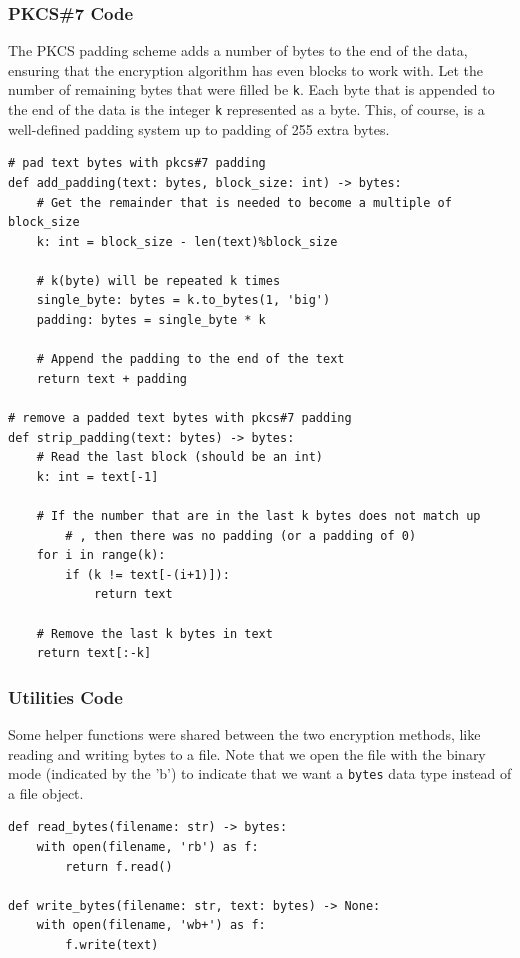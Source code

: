 \documentclass[11pt]{article}
\begin{document}
\subsubsection*{PKCS\#7 Code} 

The PKCS padding scheme adds a number of bytes to the end of the data, ensuring that the encryption algorithm has even blocks to work with. Let the number of remaining bytes that were filled be \verb|k|. Each byte that is appended to the end of the data is the integer \verb|k| represented as a byte. This, of course, is a well-defined padding system up to padding of 255 extra bytes.

\begin{framed}
\begin{verbatim}
# pad text bytes with pkcs#7 padding
def add_padding(text: bytes, block_size: int) -> bytes:
    # Get the remainder that is needed to become a multiple of block_size
    k: int = block_size - len(text)%block_size

    # k(byte) will be repeated k times
    single_byte: bytes = k.to_bytes(1, 'big')
    padding: bytes = single_byte * k

    # Append the padding to the end of the text 
    return text + padding 

# remove a padded text bytes with pkcs#7 padding
def strip_padding(text: bytes) -> bytes:
    # Read the last block (should be an int)
    k: int = text[-1]

    # If the number that are in the last k bytes does not match up
		# , then there was no padding (or a padding of 0)
    for i in range(k):
        if (k != text[-(i+1)]):
            return text 

    # Remove the last k bytes in text 
    return text[:-k]
\end{verbatim}
\end{framed}

\subsubsection*{Utilities Code}

Some helper functions were shared between the two encryption methods, like reading and writing bytes to a file. Note that we open the file with the binary mode (indicated by the 'b') to indicate that we want a \verb|bytes| data type instead of a file object.

\begin{framed}
\begin{verbatim}
def read_bytes(filename: str) -> bytes:
    with open(filename, 'rb') as f:
        return f.read()

def write_bytes(filename: str, text: bytes) -> None:
    with open(filename, 'wb+') as f:
        f.write(text)
\end{verbatim}
\end{framed}
\end{document}
